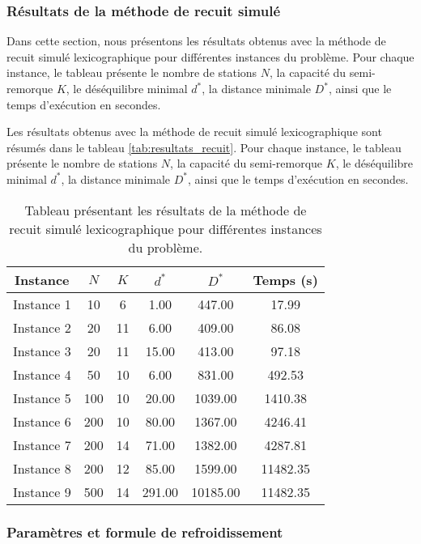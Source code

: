 \documentclass{article}
\begin{document}
\subsubsection{Résultats de la méthode de recuit simulé}

Dans cette section, nous présentons les résultats obtenus avec la méthode de recuit simulé lexicographique pour différentes instances du problème. Pour chaque instance, le tableau présente le nombre de stations $N$, la capacité du semi-remorque $K$, le déséquilibre minimal $d^*$, la distance minimale $D^*$, ainsi que le temps d'exécution en secondes.

Les résultats obtenus avec la méthode de recuit simulé lexicographique sont résumés dans le tableau \ref{tab:resultats_recuit}. Pour chaque instance, le tableau présente le nombre de stations $N$, la capacité du semi-remorque $K$, le déséquilibre minimal $d^*$, la distance minimale $D^*$, ainsi que le temps d'exécution en secondes.

\begin{table}[h!]
\centering
\begin{tabular}{|c|c|c|c|c|c|}
\hline
Instance & $N$ & $K$ & $d^*$ & $D^*$ & Temps (s) \\
\hline
Instance 1 & 10 & 6 & 1.00 & 447.00 & 17.99 \\
Instance 2 & 20 & 11 & 6.00 & 409.00 & 86.08 \\
Instance 3 & 20 & 11 & 15.00 & 413.00 & 97.18 \\
Instance 4 & 50 & 10 & 6.00 & 831.00 & 492.53 \\
Instance 5 & 100 & 10 & 20.00 & 1039.00 & 1410.38 \\
Instance 6 & 200 & 10 & 80.00 & 1367.00 & 4246.41 \\
Instance 7 & 200 & 14 & 71.00 & 1382.00 & 4287.81 \\
Instance 8 & 200 & 12 & 85.00 & 1599.00 & 11482.35 \\
Instance 9 & 500 & 14 & 291.00 & 10185.00 & 11482.35 \\
\hline
\end{tabular}

\vspace{0.5cm}
\caption{Tableau présentant les résultats de la méthode de recuit simulé lexicographique pour différentes instances du problème.}
\end{table}

\subsubsection{Paramètres et formule de refroidissement}
\end{document}
